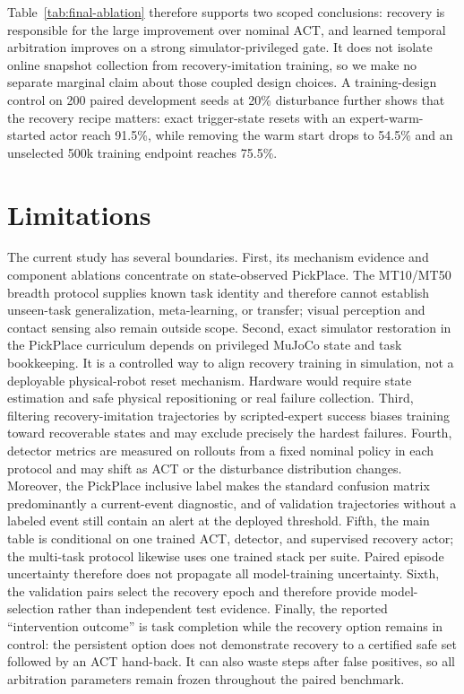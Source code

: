\documentclass[conference]{IEEEtran}
\begin{document}
Table~\ref{tab:final-ablation} therefore supports two scoped conclusions:
recovery is responsible for the large improvement over nominal ACT, and learned
temporal arbitration improves on a strong simulator-privileged gate. It does
not isolate online snapshot collection from recovery-imitation training, so we
make no separate marginal claim about those coupled design choices.
A training-design control on 200 paired development seeds at 20\% disturbance
further shows that the recovery recipe matters: exact trigger-state resets with
an expert-warm-started actor reach 91.5\%, while removing the warm start drops
to 54.5\% and an unselected 500k training endpoint reaches 75.5\%.

\section{Limitations}
\label{sec:limitations}

The current study has several boundaries. First, its mechanism evidence and
component ablations concentrate on state-observed PickPlace. The MT10/MT50
breadth protocol supplies known task identity and therefore cannot establish
unseen-task generalization, meta-learning, or transfer; visual perception and
contact sensing also remain outside scope. Second, exact simulator restoration
in the PickPlace curriculum depends on privileged MuJoCo state and task
bookkeeping. It is a controlled way to align recovery training in simulation,
not a deployable physical-robot reset mechanism. Hardware would require state
estimation and safe physical repositioning or real failure collection. Third,
filtering recovery-imitation
trajectories by scripted-expert success biases training toward recoverable states and may
exclude precisely the hardest failures. Fourth, detector metrics are measured
on rollouts from a fixed nominal policy in each protocol and may shift as ACT or
the disturbance distribution changes. Moreover, the PickPlace inclusive label
makes the standard confusion matrix predominantly a current-event diagnostic, and
\DetectorNonEventTrajectoryAlert{} of validation trajectories without a labeled
event still contain an alert at the deployed threshold. Fifth, the main table
is conditional on one trained ACT, detector, and supervised recovery actor; the
multi-task protocol likewise uses one trained stack per suite. Paired episode
uncertainty therefore does not propagate all model-training uncertainty. Sixth, the validation
pairs select the recovery epoch and therefore provide model-selection rather
than independent test evidence. Finally, the reported ``intervention outcome''
is task completion while the recovery option remains in control: the
persistent option does not demonstrate recovery
to a certified safe set followed by an ACT hand-back. It can also waste steps
after false positives, so all arbitration parameters remain frozen throughout
the paired benchmark.
\end{document}
